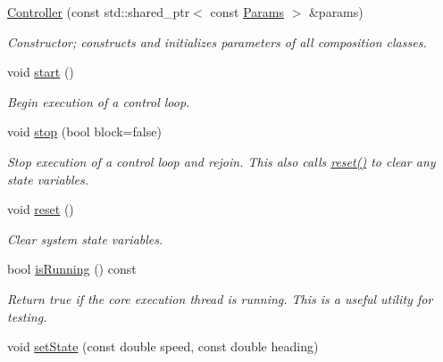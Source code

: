 \begin{DoxyCompactItemize}
\item 
\hyperlink{classackermann_1_1_controller_a4bf9f0657a103e0144ef14f9b8a7c96e}{Controller} (const std\+::shared\+\_\+ptr$<$ const \hyperlink{structackermann_1_1_params}{Params} $>$ \&params)
\begin{DoxyCompactList}\small\item\em Constructor; constructs and initializes parameters of all composition classes. \end{DoxyCompactList}\item 
\mbox{\label{classackermann_1_1_controller_a65fb63861770f823cd30713833383aa6}} 
void \hyperlink{classackermann_1_1_controller_a65fb63861770f823cd30713833383aa6}{start} ()
\begin{DoxyCompactList}\small\item\em Begin execution of a control loop. \end{DoxyCompactList}\item 
void \hyperlink{classackermann_1_1_controller_a285777e5abee8b5ec7eb683410215a04}{stop} (bool block=false)
\begin{DoxyCompactList}\small\item\em Stop execution of a control loop and rejoin. This also calls \hyperlink{classackermann_1_1_controller_ab225ab7b942ed1590cc91b0343860924}{reset()} to clear any state variables. \end{DoxyCompactList}\item 
\mbox{\label{classackermann_1_1_controller_ab225ab7b942ed1590cc91b0343860924}} 
void \hyperlink{classackermann_1_1_controller_ab225ab7b942ed1590cc91b0343860924}{reset} ()
\begin{DoxyCompactList}\small\item\em Clear system state variables. \end{DoxyCompactList}\item 
bool \hyperlink{classackermann_1_1_controller_ac42d34ea838ccf8e9f83199b5753c08e}{is\+Running} () const
\begin{DoxyCompactList}\small\item\em Return true if the core execution thread is running. This is a useful utility for testing. \end{DoxyCompactList}\item 
void \hyperlink{classackermann_1_1_controller_aee37f9adf9e8b2ec31499c8f7838531d}{set\+State} (const double speed, const double heading)

\end{DoxyCompactItemize}
